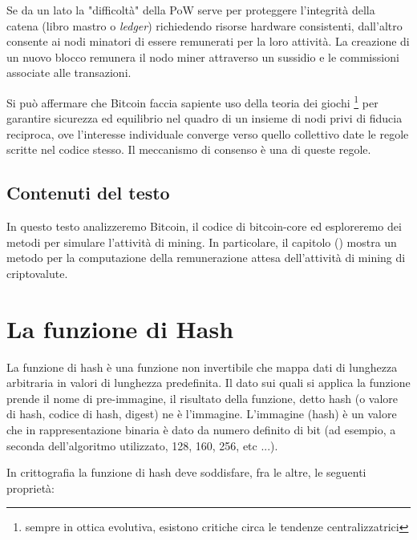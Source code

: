 \documentclass{book}
\theoremstyle{definition}
\begin{document}
Se da un lato la "difficoltà" della PoW serve per proteggere l'integrità della catena (libro mastro o \textit{ledger}) richiedendo risorse hardware consistenti,
dall'altro consente ai nodi minatori di essere remunerati per la loro attività. La creazione di un nuovo blocco remunera il nodo miner attraverso un sussidio e le commissioni associate alle transazioni. 

Si può affermare che Bitcoin faccia sapiente uso della teoria dei giochi \footnote{sempre in ottica evolutiva, esistono critiche circa le tendenze centralizzatrici} per garantire sicurezza ed equilibrio nel quadro di un insieme di nodi privi di fiducia reciproca, ove l'interesse individuale converge verso quello collettivo date le regole scritte nel codice stesso.
Il meccanismo di consenso è una di queste regole.

\subsection{Contenuti del testo}

In questo testo analizzeremo Bitcoin, il codice di bitcoin-core ed esploreremo dei metodi per simulare l'attività di mining.
In particolare, il capitolo () mostra un metodo per la computazione della remunerazione attesa dell'attività di mining di criptovalute.

\newpage

\section{La funzione di Hash}

La funzione di hash è una funzione non invertibile che mappa dati di lunghezza arbitraria in valori di lunghezza predefinita.
Il dato sui quali si applica la funzione prende il nome di pre-immagine, il risultato della funzione, detto hash (o valore di hash, codice di hash, digest) ne è l'immagine.
L'immagine (hash) è un valore che in rappresentazione binaria è dato da numero definito di bit (ad esempio, a seconda dell'algoritmo utilizzato, 128, 160, 256, etc ...).

In crittografia la funzione di hash deve soddisfare, fra le altre, le seguenti proprietà:
\end{document}
